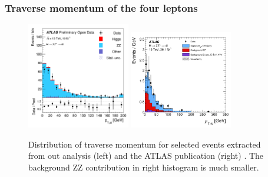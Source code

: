 \documentclass[aspectratio=1610, english]{beamer}
\begin{document}
\begin{frame}
\frametitle{Traverse momentum of the four leptons}


\begin{figure} [H]
\centering
\includegraphics[width=0.4\textwidth]{hist_fourlepsys_pt.png}
\includegraphics[width=0.4\textwidth]{hist_fourlepsys_pt_pub.png}
\caption{ Distribution of traverse momentum for selected events extracted from out analysis (left) and the ATLAS publication (right) \cite{hzz}. The background ZZ contribution in right histogram is much smaller.}
\end{figure}

\end{frame}
\end{document}
